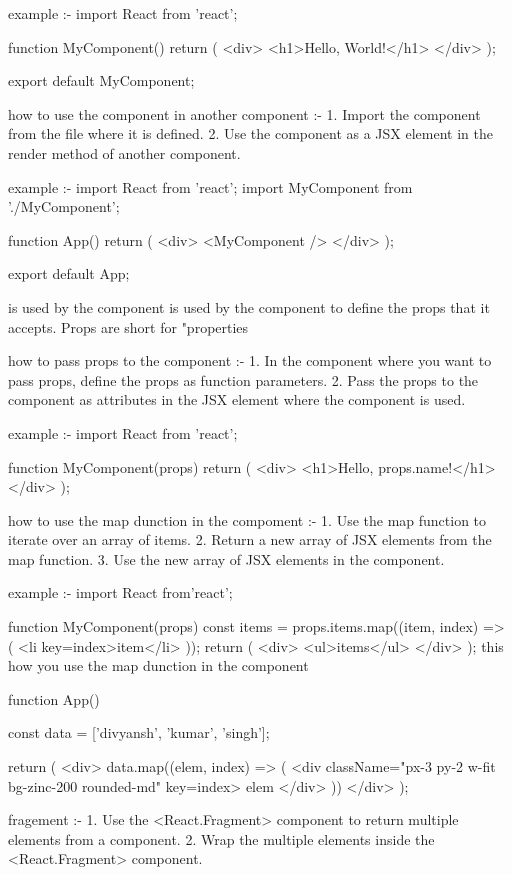 example :-
import React from 'react';

function MyComponent() {
  return (
    <div>
      <h1>Hello, World!</h1>
    </div>
  );
}

export default MyComponent;

how to use the component in another component :-
1. Import the component from the file where it is defined.
2. Use the component as a JSX element in the render method of another component.

example :-
import React from 'react';
import MyComponent from './MyComponent';

function App() {
  return (
    <div>
      <MyComponent />
    </div>
    );
}

export default App;

{} is used by the component
{} is used by the component to define the props that it accepts. Props are short for "properties

how to pass props to the component :-
1. In the component where you want to pass props, define the props as function parameters.
2. Pass the props to the component as attributes in the JSX element where the component is used.

example :-
import React from 'react';

function MyComponent(props) {
  return (
    <div>
      <h1>Hello, {props.name}!</h1>
    </div>
  );
}

how to use the map dunction in the compoment :-
1. Use the map function to iterate over an array of items.
2. Return a new array of JSX elements from the map function.
3. Use the new array of JSX elements in the component.

example :-
import React from'react';

function MyComponent(props) {
  const items = props.items.map((item, index) => (
    <li key={index}>{item}</li>
  ));
  return (
    <div>
      <ul>{items}</ul>
    </div>
  );
}
this how you use the map dunction in the component 


function App() {
  const data = ['divyansh', 'kumar', 'singh'];
  
  return (
    <div>
      {data.map((elem, index) => (
        <div className="px-3 py-2 w-fit bg-zinc-200 rounded-md" key={index}>
          {elem}
        </div>
      ))}
    </div>
  );
}

fragement :- 
1. Use the <React.Fragment> component to return multiple elements from a component.
2. Wrap the multiple elements inside the <React.Fragment> component.

